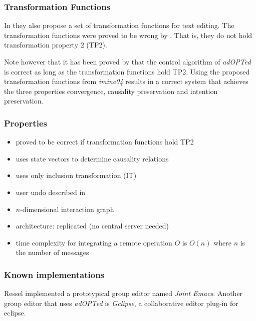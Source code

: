 \subsubsection{Transformation Functions}
In \cite{ressel96} they also propose a set of transformation functions for text editing. The transformation functions were proved to be wrong by \cite{imine03}. That is, they do not hold transformation property 2 (TP2). 

Note however that it has been proved by \cite{cormack02} that the control algorithm of \emph{adOPTed} is correct as long as the transformation functions hold TP2. Using the proposed transformation functions from \emph{imine04} results in a correct system that achieves the three properties convergence, causality preservation and intention preservation.


\subsubsection{Properties}
\begin{itemize}
 \item proved to be correct if transformation functions hold TP2
 \item uses state vectors to determine causality relations
 \item uses only inclusion transformation (IT)
 \item user undo described in \cite{ressel99}
 \item $n$-dimensional interaction graph
 \item architecture: replicated (no central server needed)
 \item time complexity for integrating a remote operation $O$ is $O(n)$ 
       where $n$ is the number of messages
\end{itemize}


\subsubsection{Known implementations}
Ressel implemented a prototypical group editor named \emph{Joint Emacs}. Another group editor that uses \emph{adOPTed} is \emph{Gclipse}, a collaborative editor plug-in for eclipse.
